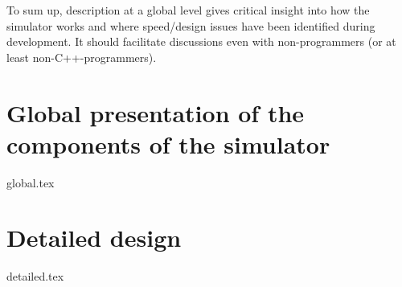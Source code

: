 \documentclass[12pt]{article}
\theoremstyle{definition}
\theoremstyle{remark}
\numberwithin{equation}{section}
\begin{document}
To sum up, description at a global level gives critical insight into how the simulator works and where speed/design issues have been identified during development. It should facilitate discussions even with non-programmers (or at least non-C++-programmers).

\section{Global presentation of the components of the simulator}
{global.tex}
\clearpage

\section{Detailed design}
{detailed.tex}
\clearpage
\end{document}
